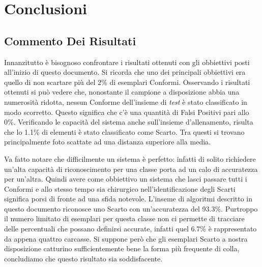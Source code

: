 
\chapter{Conclusioni}

\section{Commento Dei Risultati}
Innanzitutto è bisognoso confrontare i risultati ottenuti con gli obbiettivi posti all'inizio di questo documento.
Si ricorda che uno dei principali obbiettivi era quello di non scartare più del 2\% di esemplari Conformi.
Osservando i risultati ottenuti si può vedere che, nonostante il campione a disposizione abbia una numerosità ridotta, nessun Conforme dell'insieme di \textit{test} è stato classificato in modo scorretto.
Questo significa che c'è una quantità di Falsi Positivi pari allo 0\%.
Verificando le capacità del sistema anche sull'insieme d'allenamento, risulta che lo 1.1\% di elementi è stato classificato come Scarto.
Tra questi si trovano principalmente foto scattate ad una distanza superiore alla media.

Va fatto notare che difficilmente un sistema è perfetto: infatti di solito richiedere un'alta capacità di riconoscimento per una classe porta ad un calo di accuratezza per un'altra.
Quindi avere come obbiettivo un sistema che lasci passare tutti i Conformi e allo stesso tempo sia chirurgico nell'identificazione degli Scarti significa porsi di fronte ad una sfida notevole.
L'inseme di algoritmi descritto in questo documento riconosce uno Scarto con un'accuratezza del 93.3\%.
Purtroppo il numero limitato di esemplari per questa classe non ci permette di tracciare delle percentuali che possano definirsi accurate, infatti quel 6.7\% è rappresentato da appena quattro carcasse.
Si suppone però che gli esemplari Scarto a nostra disposizione catturino sufficientemente bene la forma più frequente di colla, concludiamo che questo risultato sia soddisfacente.

